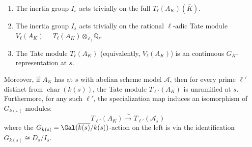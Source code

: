 \begin{theorem}
\begin{enumerate}
        \item The inertia group $I_s$ acts trivially on the full  $T_\ell(A_K)(\bar{K})$.
        \item The inertia group $I_s$ acts trivially on the rational $\ell$-adic Tate module $V_\ell(A_K) = T_\ell(A_K) \otimes_{\mathbb{Z}_\ell} \mathbb{Q}_\ell$.
        \item The Tate module $T_\ell(A_K)$ (equivalently, $V_\ell(A_K)$) is an  continuous $G_K$-representation at $s$.
    \end{enumerate}

    Moreover, if $A_K$ has  at $s$ with abelian scheme model $\mathcal{A}$, then for every prime $\ell'$ distinct from $\operatorname{char}(k(s))$, the Tate module $T_{\ell'}(A_K)$ is unramified at $s$. Furthermore, for any such $\ell'$, the specialization map induces an isomorphism of $G_{k(s)}$-modules:
    $$T_{\ell'}(A_K) \xrightarrow{\sim} T_{\ell'}(\mathcal{A}_s)$$
    where the $G_{k(s)} = \Gal(\overline{k(s)}/k(s))$-action on the left is via the identification $G_{k(s)} \cong D_s / I_s$.
\end{theorem}
